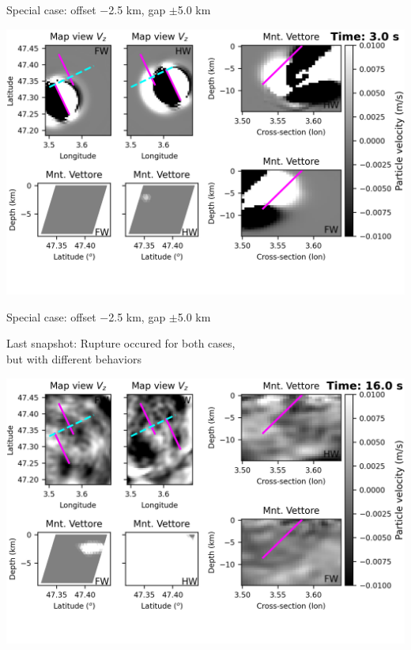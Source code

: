 \documentclass{beamer}
\begin{document}
\begin{frame}
 {Special case: offset $-$2.5 km, gap $\pm$5.0 km}

\begin{center}
    \includegraphics[width=1\linewidth]{images/video_waves/horizontal_delta_00015}
\end{center}
\addtocounter{framenumber}{-1}

\end{frame}


\begin{frame}
 {Special case: offset $-$2.5 km, gap $\pm$5.0 km}

\begin{center}

Last snapshot: Rupture occured for both cases, \\ but with different behaviors

    \includegraphics[width=1\linewidth]{images/video_waves/horizontal_delta_00080}
\end{center}
\addtocounter{framenumber}{-1}

\end{frame}
\end{document}

